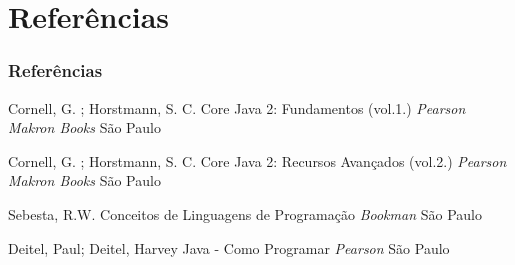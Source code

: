 \documentclass{beamer}
\begin{document}
\section{Referências}

\begin{frame}
	\frametitle{Referências}
	\footnotesize{
		\begin{thebibliography}{99} %
			 Cornell, G. ; Horstmann, S. C. 
			\newblock Core Java 2: Fundamentos (vol.1.)
			\newblock \emph{Pearson Makron Books} São Paulo
		\end{thebibliography}
		\begin{thebibliography}{99} %
			 Cornell, G. ; Horstmann, S. C. 
			\newblock Core Java 2: Recursos Avançados (vol.2.)
			\newblock \emph{Pearson Makron Books} São Paulo
		\end{thebibliography}
		\begin{thebibliography}{99} %
			 Sebesta, R.W.
			\newblock Conceitos de Linguagens de Programação
			\newblock \emph{Bookman} São Paulo
		\end{thebibliography}
		\begin{thebibliography}{99} %
			 Deitel, Paul; Deitel, Harvey
			\newblock Java - Como Programar
			\newblock \emph{Pearson} São Paulo
		\end{thebibliography}
	}
\end{frame}

\end{document}
